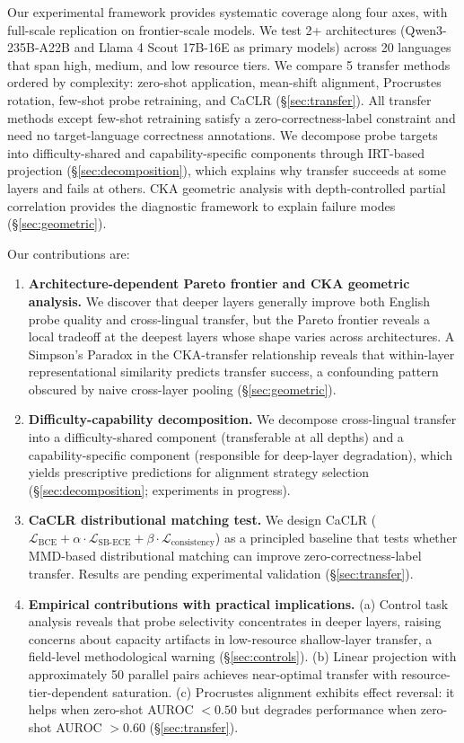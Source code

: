 Our experimental framework provides systematic coverage along four axes, with full-scale replication on frontier-scale models. We test 2+ architectures (Qwen3-235B-A22B and Llama 4 Scout 17B-16E as primary models) across 20 languages that span high, medium, and low resource tiers. We compare 5 transfer methods ordered by complexity: zero-shot application, mean-shift alignment, Procrustes rotation, few-shot probe retraining, and CaCLR (\S\ref{sec:transfer}). All transfer methods except few-shot retraining satisfy a zero-correctness-label constraint and need no target-language correctness annotations. We decompose probe targets into difficulty-shared and capability-specific components through IRT-based projection (\S\ref{sec:decomposition}), which explains why transfer succeeds at some layers and fails at others. CKA geometric analysis with depth-controlled partial correlation provides the diagnostic framework to explain failure modes (\S\ref{sec:geometric}).

Our contributions are:
\begin{enumerate}
\item \textbf{Architecture-dependent Pareto frontier and CKA geometric analysis.} We discover that deeper layers generally improve both English probe quality and cross-lingual transfer, but the Pareto frontier reveals a local tradeoff at the deepest layers whose shape varies across architectures. A Simpson's Paradox in the CKA-transfer relationship reveals that within-layer representational similarity predicts transfer success, a confounding pattern obscured by naive cross-layer pooling (\S\ref{sec:geometric}).

\item \textbf{Difficulty-capability decomposition.} We decompose cross-lingual transfer into a difficulty-shared component (transferable at all depths) and a capability-specific component (responsible for deep-layer degradation), which yields prescriptive predictions for alignment strategy selection (\S\ref{sec:decomposition}; experiments in progress).

\item \textbf{CaCLR distributional matching test.} We design CaCLR ($\mathcal{L}_{\text{BCE}} + \alpha \cdot \mathcal{L}_{\text{SB-ECE}} + \beta \cdot \mathcal{L}_{\text{consistency}}$) as a principled baseline that tests whether MMD-based distributional matching can improve zero-correctness-label transfer. Results are pending experimental validation (\S\ref{sec:transfer}).

\item \textbf{Empirical contributions with practical implications.} (a) Control task analysis reveals that probe selectivity concentrates in deeper layers, raising concerns about capacity artifacts in low-resource shallow-layer transfer, a field-level methodological warning (\S\ref{sec:controls}). (b) Linear projection with approximately 50 parallel pairs achieves near-optimal transfer with resource-tier-dependent saturation. (c) Procrustes alignment exhibits effect reversal: it helps when zero-shot AUROC $< 0.50$ but degrades performance when zero-shot AUROC $> 0.60$ (\S\ref{sec:transfer}).
\end{enumerate}
